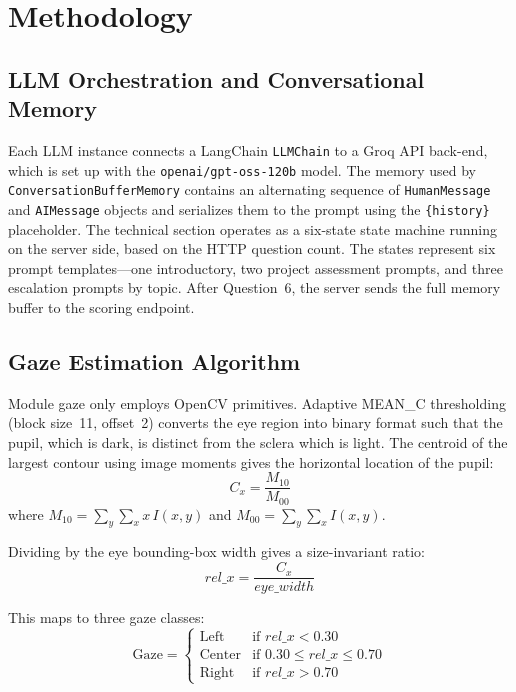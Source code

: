 \documentclass[conference]{IEEEtran}
\begin{document}
\section{Methodology}

\subsection{LLM Orchestration and Conversational Memory}
\label{sec:llm}

Each LLM instance connects a LangChain \texttt{LLMChain} to a Groq API
back-end, which is set up with the \texttt{openai/gpt-oss-120b} model.
The memory used by \texttt{ConversationBufferMemory} contains an
alternating sequence of \texttt{HumanMessage} and \texttt{AIMessage}
objects and serializes them to the prompt using the
\texttt{\{history\}} placeholder. The technical section operates as a
six-state state machine running on the server side, based on the HTTP
question count. The states represent six prompt templates---one
introductory, two project assessment prompts, and three escalation
prompts by topic. After Question~6, the server sends the full memory
buffer to the scoring endpoint.

\subsection{Gaze Estimation Algorithm}
\label{sec:gaze}

Module gaze only employs OpenCV primitives. Adaptive MEAN\_C
thresholding (block size~11, offset~2) converts the eye region into
binary format such that the pupil, which is dark, is distinct from the
sclera which is light. The centroid of the largest contour using image
moments gives the horizontal location of the pupil:
\begin{equation}
  C_x = \frac{M_{10}}{M_{00}}
  \label{eq:cx}
\end{equation}
where $M_{10} = \sum_{y}\sum_{x} x\,I(x,y)$ and
$M_{00} = \sum_{y}\sum_{x} I(x,y)$.

Dividing by the eye bounding-box width gives a size-invariant ratio:
\begin{equation}
  \mathit{rel\_x} = \frac{C_x}{\mathit{eye\_width}}
  \label{eq:relx}
\end{equation}

This maps to three gaze classes:
\begin{equation}
  \text{Gaze} =
  \begin{cases}
    \text{Left}   & \text{if } \mathit{rel\_x} < 0.30 \\
    \text{Center} & \text{if } 0.30 \leq \mathit{rel\_x} \leq 0.70 \\
    \text{Right}  & \text{if } \mathit{rel\_x} > 0.70
  \end{cases}
  \label{eq:gaze}
\end{equation}
\end{document}
